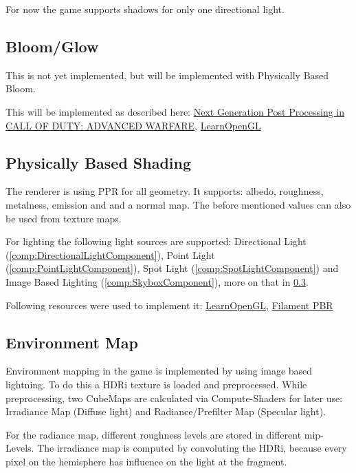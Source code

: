 \documentclass{article}
\begin{document}
For now the game supports shadows for only one directional light.

\subsection{Bloom/Glow}

This is not yet implemented, but will be implemented with Physically Based Bloom.

This will be implemented as described here: \href{https://www.iryoku.com/next-generation-post-processing-in-call-of-duty-advanced-warfare}{Next Generation Post Processing in CALL OF DUTY: ADVANCED WARFARE}, \href{https://learnopengl.com/Guest-Articles/2022/Phys.-Based-Bloom}{LearnOpenGL}

\subsection{Physically Based Shading}

The renderer is using PPR for all geometry. It supports: albedo, roughness, metalness, emission and and a normal map. The before mentioned values can also be used from texture maps.

For lighting the following light sources are supported: Directional Light (\ref{comp:DirectionalLightComponent}), Point Light (\ref{comp:PointLightComponent}), Spot Light (\ref{comp:SpotLightComponent}) and Image Based Lighting (\ref{comp:SkyboxComponent}), more on that in \ref{sec:environmentMap}.

Following resources were used to implement it: \href{https://learnopengl.com/PBR/Theory}{LearnOpenGL}, \href{https://google.github.io/filament/Filament.md.html}{Filament PBR}

\subsection{Environment Map}
\label{sec:environmentMap}

Environment mapping in the game is implemented by using image based lightning. To do this a HDRi texture is loaded and preprocessed. While preprocessing, two CubeMaps are calculated via Compute-Shaders for later use: Irradiance Map (Diffuse light) and Radiance/Prefilter Map (Specular light).

For the radiance map, different roughness levels are stored in different mip-Levels. The irradiance map is computed by convoluting the HDRi, because every pixel on the hemisphere has influence on the light at the fragment.
\end{document}
